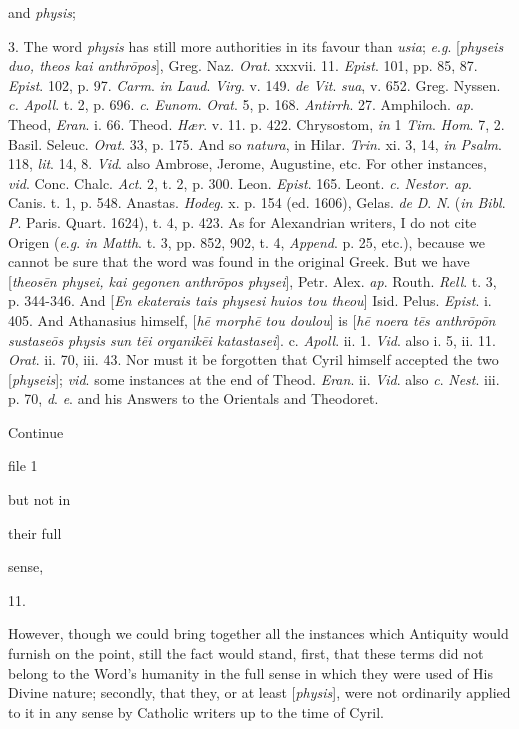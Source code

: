 and \emph{physis};

3. The word \emph{physis} has still more
authorities in its favour than \emph{usia}; \emph{e}.\emph{g}.
[\emph{physeis duo, theos kai anthr\={o}pos}], Greg. Naz. \emph{Orat}.
xxxvii. 11. \emph{Epist}. 101, pp. 85, 87. \emph{Epist}. 102,
p. 97. \emph{Carm}. \emph{in Laud}. \emph{Virg}. v. 149. \emph{de
Vit}. \emph{sua}, v. 652. Greg. Nyssen. \emph{c.} \emph{Apoll}.
t. 2, p. 696. \emph{c}. \emph{Eunom}. \emph{Orat}. 5, p. 168. \emph{Antirrh}.
27. Amphiloch. \emph{ap}. Theod, \emph{Eran}. i. 66. Theod. \emph{Hær}.
v. 11. p. 422. Chrysostom, \emph{in} 1 \emph{Tim}. \emph{Hom}.
7, 2. Basil. Seleuc. \emph{Orat}. 33, p. 175. And so \emph{natura},
in Hilar. \emph{Trin}. xi. 3, 14, \emph{in Psalm}. 118, \emph{lit}.
14, 8. \emph{Vid}. also Ambrose, Jerome, Augustine, etc. For
other instances, \emph{vid}. Conc. Chalc. \emph{Act}. 2, t. 2,
p. 300. Leon. \emph{Epist}. 165. Leont. \emph{c.} \emph{Nestor.}
\emph{ap}. Canis. t. 1, p. 548. Anastas. \emph{Hodeg}. x. p.
154 (ed. 1606), Gelas. \emph{de} \emph{D}. \emph{N}. (\emph{in
Bibl}. \emph{P}. Paris. Quart. 1624), t. 4, p. 423. As for
Alexandrian writers, I do not cite Origen (\emph{e}.\emph{g}. \emph{in
Matth}. t. 3, pp. 852, 902, t. 4, \emph{Append}. p. 25,
etc.), because we cannot be sure that the word was found in
the original Greek. But we have [\emph{theos}\emph{\={e}n
physei, kai gegonen anthr\={o}pos physei}], Petr. Alex. \emph{ap}.
Routh. \emph{Rell}. t. 3, p. 344-346. And [\emph{En ekaterais
tais physesi huios tou theou}] Isid. Pelus. \emph{Epist}. i.
405. And Athanasius himself, [\emph{h\={e} morph\={e} tou
doulou}] is [\emph{h\={e} noera t\={e}s anthr\={o}p\={o}n
sustase\={o}s physis sun t\={e}i organik\={e}i
katastasei}]. c. \emph{Apoll}. ii. 1. \emph{Vid}. also i.
5, ii. 11. \emph{Orat}. ii. 70, iii. 43. Nor must it be
forgotten that Cyril himself accepted the two [\emph{physeis}];
\emph{vid}. some instances at the end of Theod. \emph{Eran}.
ii. \emph{Vid}. also \emph{c}. \emph{Nest}. iii. p. 70, \emph{d}.
\emph{e}. and his Answers to the Orientals and Theodoret.

Continue


file 1

but not in

their full

sense,

11.

However, though we could bring together
all the instances which Antiquity would furnish on the point,
still the fact would stand, first, that these terms did not
belong to the Word's humanity in the full sense in which
they were used of His Divine nature; secondly, that they, or
at least [\emph{physis}], were not ordinarily applied to it in
any sense by Catholic writers up to the time of Cyril.

